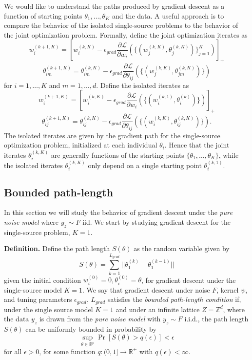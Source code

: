 \documentclass[11pt]{article}
\begin{document}
We would like to understand the paths produced by gradient descent as
a function of starting points $\theta_1,\hdots, \theta_K$ and the
data.  A useful approach is to compare the behavior of the isolated
single-source problems to the behavior of the joint optimization
problem.  Formally, define the joint optimization iterates as
\[
w_i^{(k + 1, K)} = \left[w_i^{(k, K)} - \epsilon_{grad} \frac{\partial \mathcal{L}}{\partial w_i}(\{(w_j^{(k, K)}, \theta_j^{(k, K)})\}_{j=1}^K)\right]_+
\]
\[
\theta_{im}^{(k + 1, K)} = \theta_{im}^{(k, K)} - \epsilon_{grad} \frac{\partial \mathcal{L}}{\partial \theta_{ij}}(\{(w_j^{(k, K)}, \theta_{jm}^{(k, K)})\})
\]
for $i = 1,\hdots, K$ and $m=1,\hdots, d$.
Define the isolated iterates as
\[
w_i^{(k + 1, K)} = \left[w_i^{(k, K)} - \epsilon_{grad} \frac{\partial \mathcal{L}}{\partial w_i}(\{(w_i^{(k, 1)}, \theta_i^{(k)})\})\right]_+
\]
\[
\theta_{ij}^{(k + 1, K)} = \theta_{ij}^{(k, K)} - \epsilon_{grad} \frac{\partial \mathcal{L}}{\partial \theta_{ij}}(\{(w_i^{(k, K)}, \theta_{ij}^{(k, K)})\}).
\]
The isolated iterates are given by the gradient path for the
single-source optimization problem, initialized at each individual
$\theta_i$.  Hence that the joint iterates $\theta_i^{(k, K)}$ are
generally functions of the starting points $\{\theta_1,\hdots,
\theta_K\}$, while the isolated iterates $\theta_i^{(k, K)}$ only
depend on a single starting point $\theta_i^{(k, 1)}$.


\subsection{Bounded path-length}

In this section we will study the behavior of gradient descent under the \emph{pure noise model} where $y_z \sim F$ iid.
We start by studying gradient descent for the single-source problem, $K=1$.

\textbf{Definition. }  Define the path length $S(\theta)$ as the random variable given by
\[
S(\theta) = \sum_{k=1}^{L_{grad}} ||\theta_1^{(k)} - \theta_1^{(k - 1)}||
\]
given the initial condition $w_i^{(0)} = 0, \theta_i^{(0)} = \theta$,
for gradient descent under the single-source model $K=1$.  We say that
gradient descent under noise $F$, kernel $\psi$, and tuning parameters
$\epsilon_{grad}$, $L_{grad}$ satisfies the \emph{bounded path-length
  condition} if, under the single source model $K=1$ and under an
infinite lattice $Z = \mathbb{Z}^d$, where the data $y_z$ is drawn
from the \emph{pure noise model} with $y_z \sim F$ i.i.d., the path
length $S(\theta)$ can be uniformly bounded in probability by
\[
\sup_{\theta \in \mathbb{R}^p} \Pr[S(\theta) > q(\epsilon)] < \epsilon
\]
for all $\epsilon > 0$, for some function $q: (0, 1] \to
  \mathbb{R}^+$ with $q(\epsilon) < \infty$.
\end{document}
